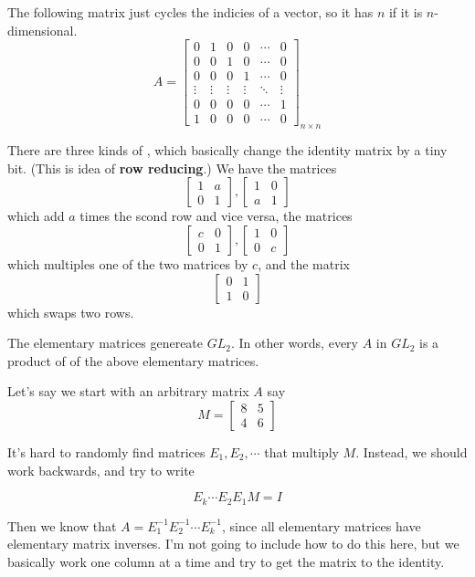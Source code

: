 \documentclass[11pt]{article}
\begin{document}
\begin{example}
    The following matrix just cycles the indicies of a vector, so it has $n$ if it is $n$-dimensional.
    \[
        A = \begin{bmatrix}
            0      & 1      & 0      & 0      & \cdots & 0      \\
            0      & 0      & 1      & 0      & \cdots & 0      \\
            0      & 0      & 0      & 1      & \cdots & 0      \\
            \vdots & \vdots & \vdots & \vdots & \ddots & \vdots \\
            0      & 0      & 0      & 0      & \cdots & 1      \\
            1      & 0      & 0      & 0      & \cdots & 0
        \end{bmatrix}_{n \times n}
    \]
\end{example}

There are three kinds of , which basically change
the identity matrix by a tiny bit. (This is idea of \textbf{row reducing}.) We
have the matrices
\[
    \begin{bmatrix}
        1 & a \\
        0 & 1
    \end{bmatrix},
    \begin{bmatrix}
        1 & 0 \\
        a & 1
    \end{bmatrix}
\]
which add $a$ times the scond row and vice versa, the matrices
\[
    \begin{bmatrix}
        c & 0 \\
        0 & 1
    \end{bmatrix},
    \begin{bmatrix}
        1 & 0 \\
        0 & c
    \end{bmatrix}
\]
which multiples one of the two matrices by $c$, and the matrix
\[
    \begin{bmatrix}
        0 & 1 \\
        1 & 0
    \end{bmatrix}
\]
which swaps two rows.

\begin{theorem}
    The elementary matrices genereate $GL_2$. In other words, every $A$ in $GL_2$ is a product of of the above elementary matrices.
\end{theorem}

Let's say we start with an arbitrary matrix $A$ say
\[ M = 
    \begin{bmatrix}
    8 & 5 \\
    4 & 6
    \end{bmatrix}
\]

It's hard to randomly find matrices $E_1, E_2, \cdots $ that multiply $M$. Instead, we should work backwards, and try to write 

\[
E_k \cdots E_2 E_1 M = I
\]

Then we know that $A = E_1^{-1}E_2^{-1}\cdots E_k^{-1}$, since all elementary matrices have elementary matrix inverses. I'm not going to include how to do this here, but we basically work one column at a time and try to get the matrix to the identity.
\end{document}
